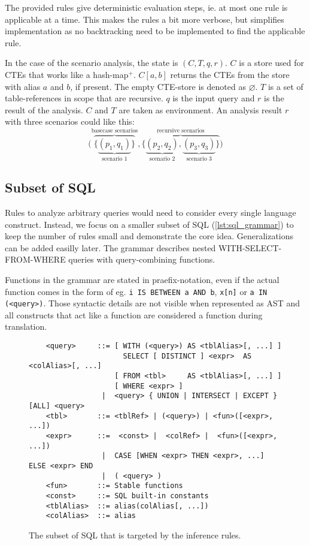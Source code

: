 The provided rules give deterministic evaluation steps, ie. at most one rule is applicable at a time. This makes the rules a bit more verbose, but simplifies implementation as no backtracking need to be implemented to find the applicable rule.

In the case of the scenario analysis, the state is $(C, T, q, r)$. $C$ is a store used for CTEs that works like a hash-map${}^+$. $C[a, b]$ returns the CTEs from the store with alias $a$ and $b$, if present. The empty CTE-store is denoted as $\varnothing$. $T$ is a set of table-references in scope that are recursive. $q$ is the input query and $r$ is the result of the analysis. $C$ and $T$ are taken as environment. An analysis result $r$ with three scenarios could like this:
$$
\Big(
    \overbrace{\big\{
        \underbrace{
            (p_1, q_1)
        }_{\text{scenario 1}}
    \big\}}^{\text{basecase scenarios}}
    ,
    \overbrace{\big\{
        \underbrace{
            (p_2, q_2)
        }_{\text{scenario 2}},
        \underbrace{
            (p_3, q_3)
        }_{\text{scenario 3}}
    \big\}}^{\text{recursive scenarios}}
\Big)
$$

\subsection{Subset of SQL}
Rules to analyze arbitrary queries would need to consider every single language construct. Instead, we focus on a smaller subset of SQL (\autoref{lst:sql_grammar}) to keep the number of rules small and demonstrate the core idea. Generalizations can be added easilly later. The grammar describes nested WITH-SELECT-FROM-WHERE queries with query-combining functions.

Functions in the grammar are stated in praefix-notation, even if the actual function comes in the form of eg. \texttt{i IS BETWEEN a AND b}, \texttt{x[n]} or \texttt{a IN (<query>)}. Those syntactic details are not visible when represented as AST and all constructs that act like a function are considered a function during translation.

\begin{figure}[H]
    \begin{verbatim}
    <query>     ::= [ WITH (<query>) AS <tblAlias>[, ...] ]
                      SELECT [ DISTINCT ] <expr>  AS <colAlias>[, ...]
                    [ FROM <tbl>     AS <tblAlias>[, ...] ]
                    [ WHERE <expr> ]
                 |  <query> { UNION | INTERSECT | EXCEPT } [ALL] <query>
    <tbl>       ::= <tblRef> | (<query>) | <fun>([<expr>, ...])
    <expr>      ::=  <const> |  <colRef> |  <fun>([<expr>, ...])
                 |  CASE [WHEN <expr> THEN <expr>, ...] ELSE <expr> END
                 |  ( <query> )
    <fun>       ::= Stable functions
    <const>     ::= SQL built-in constants
    <tblAlias>  ::= alias(colAlias[, ...])
    <colAlias>  ::= alias
    \end{verbatim}
    \caption{The subset of SQL that is targeted by the inference rules.}
    \label{lst:sql_grammar}
\end{figure}


